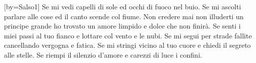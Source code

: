 [by={Salso1}]
\beginverse
Se mi vedi capelli di sole
ed occhi di fuoco nel buio.
Se mi ascolti parlare alle cose
ed il canto scende col fiume.
\endverse
\beginchorus
Non credere mai non illuderti
un principe grande ho trovato
un amore limpido e dolce che non finirà.
\endchorus
\beginverse
Se senti i miei passi al tuo fianco
e lottare col vento e le nubi.
Se mi segui per strade fallite
cancellando vergogna e fatica.
Se mi stringi vicino al tuo cuore
e chiedi il segreto alle stelle.
Se riempi il silenzio d'amore
e carezzi di luce i confini.
\endverse
\endsong
